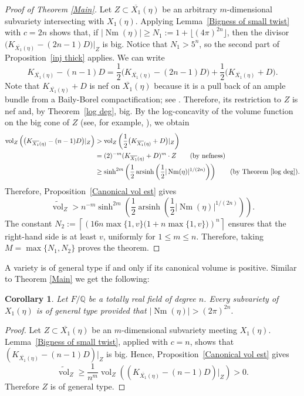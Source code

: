 \documentclass[12 pt]{amsart}
\newtheorem{Corollary}[theorem]{Corollary}
\theoremstyle{definition}
\newcommand{\Xb}{\overline{X_{1}}}
\newcommand{\Nm}{\operatorname{Nm}}
\begin{document}
\begin{proof}[Proof of Theorem \ref{Main}]
Let $Z\subset\Xb(\eta)$ be an arbitrary $m$-dimensional subvariety
intersecting with $X_1(\eta)$. Applying Lemma~\ref{Bigness of small twist} with
$c=2n$ shows that, if
$|\Nm(\eta)|\ge N_1:=1+\lfloor(4\pi)^{2n}\rfloor$, then
the divisor \(
\bigl(K_{\Xb(\eta)}-(2n-1)D\bigr)|_Z
\)
is big. Notice that \(N_1>5^n\), so the second part of Proposition~\ref{inj thick} applies. We can write
\[
K_{\Xb(\eta)}-(n-1)D
=
\frac12\bigl(K_{\Xb(\eta)}-(2n-1)D\bigr)
+
\frac12\bigl(K_{\Xb(\eta)}+D\bigr).
\]
Note that $K_{\Xb(\eta)}+D$ is nef on $\Xb(\eta)$ because it is a pull back of an ample bundle from a Baily-Borel compactification; see \cite[Proposition 3.4.b]{mumford1977hirzebruch}. 
Therefore, its restriction to
$Z$ is nef and, by
Theorem~\ref{log deg}, big. By the log-concavity of the volume function
on the big cone of $Z$ (see, for example,
\cite[Theorem~11.4.9]{Lazarsfeld2}), we obtain
\begin{align*}
\operatorname{vol}_Z\left(
\bigl(K_{\Xb(\eta)}-(n-1)D\bigr)|_Z
\right)
&>
\operatorname{vol}_Z\left(
\frac12\bigl(K_{\Xb(\eta)}+D\bigr)|_Z
\right)\\
&=
(2)^{-m}(K_{\Xb(\eta)}+D)^m\cdot Z
\qquad\text{(by nefness)}\\
&\ge
\sinh^{2m}\left(
\frac12\operatorname{arsinh}\left(
\frac12|\Nm(\eta)|^{1/(2n)}
\right)\right)
\qquad\text{(by Theorem~\ref{log deg})}.
\end{align*}
Therefore, Proposition~\ref{Canonical vol est} gives
\[
\widetilde{\operatorname{vol}}_Z
>
n^{-m}
\sinh^{2m}\left(
\frac12\operatorname{arsinh}\left(
\frac12|\Nm(\eta)|^{1/(2n)}
\right)\right).
\]
The constant
\(
N_2:=
\left\lceil
\left(16n\max\{1,v\}
\bigl(1+n\max\{1,v\}\bigr)\right)^n
\right\rceil
\)
ensures that the right-hand side is at least $v$, uniformly for
$1\le m\le n$. Therefore, taking $M=\max\{N_1,N_2\}$ proves the theorem.
\end{proof}



A variety is of general type if and only if its canonical volume is positive. Similar to Theorem \ref{Main} we get the following:  
\begin{Corollary}\label{general type}
Let $F/\mathbb Q$ be a totally real field of degree $n$. 
Every subvariety of $X_1(\eta)$
is of general type provided that 
\(
|\Nm(\eta)|>(2\pi)^{2n}.
\)
\end{Corollary}

\begin{proof}Let $Z\subset\Xb(\eta)$ be an $m$-dimensional subvariety meeting $X_1(\eta)$. Lemma~\ref{Bigness of small twist}, applied with $c=n$, shows that $(K_{\Xb(\eta)}-(n-1)D)|_Z$ is big. Hence, Proposition~\ref{Canonical vol est} gives\[\widetilde{\operatorname{vol}}_Z\ge \frac1{n^m}\operatorname{vol}_Z\left((K_{\Xb(\eta)}-(n-1)D)|_Z\right)>0.\] Therefore $Z$ is of general type.
\end{proof}
\end{document}
